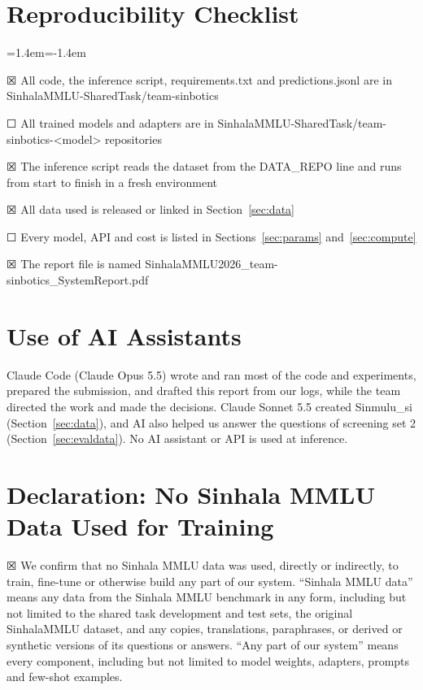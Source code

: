 \documentclass[11pt]{article}
\newcommand{\ticked}{{\symbolfont ☒}}
\newcommand{\unticked}{{\symbolfont ☐}}
\newcommand{\sinmulu}{Sinmulu\_si}
\begin{document}
\section{Reproducibility Checklist}\label{sec:reproduction}
\begin{list}{}{\leftmargin=1.4em\itemindent=-1.4em\itemsep=2pt\parsep=0pt\topsep=2pt}\raggedright
\item \ticked{} All code, the inference script, requirements.txt and predictions.jsonl are in SinhalaMMLU-SharedTask/team-sinbotics
\item \unticked{} All trained models and adapters are in SinhalaMMLU-SharedTask/team-sinbotics-<model> repositories
\item \ticked{} The inference script reads the dataset from the DATA\_REPO line and runs from start to finish in a fresh environment
\item \ticked{} All data used is released or linked in Section~\ref{sec:data}
\item \unticked{} Every model, API and cost is listed in Sections~\ref{sec:params} and~\ref{sec:compute}
\item \ticked{} The report file is named SinhalaMMLU2026\_team-sinbotics\_SystemReport.pdf
\end{list}

\smallskip
\section{Use of AI Assistants}
Claude Code (Claude Opus 5.5) wrote and ran most of the code and experiments, prepared the submission, and drafted this report from our logs, while the team directed the work and made the decisions. Claude Sonnet 5.5 created \sinmulu{} (Section~\ref{sec:data}), and AI also helped us answer the questions of screening set 2 (Section~\ref{sec:evaldata}). No AI assistant or API is used at inference.

\section{Declaration: No Sinhala MMLU Data Used for Training}\label{sec:declaration}
\ticked{} We confirm that no Sinhala MMLU data was used, directly or indirectly, to train, fine-tune or otherwise build any part of our system. ``Sinhala MMLU data'' means any data from the Sinhala MMLU benchmark in any form, including but not limited to the shared task development and test sets, the original SinhalaMMLU dataset, and any copies, translations, paraphrases, or derived or synthetic versions of its questions or answers. ``Any part of our system'' means every component, including but not limited to model weights, adapters, prompts and few-shot examples.
\end{document}
